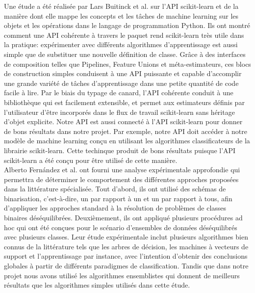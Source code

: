 \documentclass[12pt, french]{report}
\begin{document}
Une étude a été réalisée par Lars Buitinck et al. \cite{key36} sur l'API scikit-learn et de la manière dont elle mappe les concepts et les tâches de machine learning sur les objets et les opérations dans le langage de programmation Python. Ils ont montré comment une API cohérente à travers le paquet rend scikit-learn très utile dans la pratique: expérimenter avec différents algorithmes d'apprentissage est aussi simple que de substituer une nouvelle définition de classe. Grâce à des interfaces de composition telles que Pipelines, Feature Unions et méta-estimateurs, ces blocs de construction simples conduisent à une API puissante et capable d'accomplir une grande variété de tâches d'apprentissage dans une petite quantité de code facile à lire. Par le biais du typage de canard, l'API cohérente conduit à une bibliothèque qui est facilement extensible, et permet aux estimateurs définis par l'utilisateur d'être incorporés dans le flux de travail scikit-learn sans héritage d'objet explicite. Notre API est aussi connecté à l'API  scikit-learn pour donner de bons résultats dans notre projet. Par exemple, notre API doit accéder à notre modèle de machine learning conçu en utilisant les algorithmes classificateurs de la librairie  scikit-learn. Cette techinque produit de bons résultats puisque l'API  scikit-learn a été conçu pour être utilisé de cette manière.\\

Alberto Fernández et al. \cite{key30} ont fourni une analyse expérimentale approfondie qui permettra de déterminer le comportement des différentes approches proposées dans la littérature spécialisée. Tout d'abord, ils ont utilisé des schémas de binarisation, c'est-à-dire, un par rapport à un et un par rapport à tous, afin d'appliquer les approches standard à la résolution de problèmes de classes binaires déséquilibrées. Deuxièmement, ils ont appliqué plusieurs procédures ad hoc qui ont été conçues pour le scénario d'ensembles de données déséquilibrés avec plusieurs classes. Leur étude expérimentale inclut plusieurs algorithmes bien connus de la littérature tels que les arbres de décision, les machines à vecteurs de support et l'apprentissage par instance, avec l'intention d'obtenir des conclusions globales à partir de différents paradigmes de classification. Tandis que dans notre projet nous avons utilisé les algorithmes ensemblistes qui donnent de meilleurs résultats que les algorithmes simples utilisés dans cette étude.\\
\end{document}
